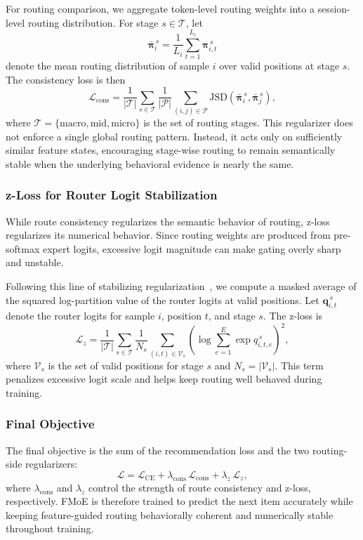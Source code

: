 \documentclass[sigconf,anonymous,review]{acmart}
\begin{document}
For routing comparison, we aggregate token-level routing weights into a session-level routing distribution. For stage $s \in \mathcal{T}$, let
\[
\bar{\boldsymbol{\pi}}_i^{\,s}
=
\frac{1}{L_i}\sum_{t=1}^{L_i}\boldsymbol{\pi}_{i,t}^{\,s}
\]
denote the mean routing distribution of sample $i$ over valid positions at stage $s$. The consistency loss is then
\[
\mathcal{L}_{\mathrm{cons}}
=
\frac{1}{|\mathcal{T}|}
\sum_{s \in \mathcal{T}}
\frac{1}{|\mathcal{P}|}
\sum_{(i,j)\in \mathcal{P}}
\mathrm{JSD}\!\left(\bar{\boldsymbol{\pi}}_i^{\,s}, \bar{\boldsymbol{\pi}}_j^{\,s}\right),
\]
where $\mathcal{T}=\{\mathrm{macro},\mathrm{mid},\mathrm{micro}\}$ is the set of routing stages. This regularizer does not enforce a single global routing pattern. Instead, it acts only on sufficiently similar feature states, encouraging stage-wise routing to remain semantically stable when the underlying behavioral evidence is nearly the same.

\subsubsection{z-Loss for Router Logit Stabilization}

While route consistency regularizes the semantic behavior of routing, z-loss regularizes its numerical behavior. Since routing weights are produced from pre-softmax expert logits, excessive logit magnitude can make gating overly sharp and unstable.

Following this line of stabilizing regularization~\cite{zoph2022stmoe}, we compute a masked average of the squared log-partition value of the router logits at valid positions. Let $\mathbf{q}_{i,t}^{\,s}$ denote the router logits for sample $i$, position $t$, and stage $s$. The z-loss is
\[
\mathcal{L}_{z}
=
\frac{1}{|\mathcal{T}|}
\sum_{s \in \mathcal{T}}
\frac{1}{N_s}
\sum_{(i,t)\in\mathcal{V}_s}
\left(
\log \sum_{e=1}^{E}\exp q_{i,t,e}^{\,s}
\right)^2,
\]
where $\mathcal{V}_s$ is the set of valid positions for stage $s$ and $N_s = |\mathcal{V}_s|$. This term penalizes excessive logit scale and helps keep routing well behaved during training.

\subsubsection{Final Objective}

The final objective is the sum of the recommendation loss and the two routing-side regularizers:
\[
\mathcal{L}
=
\mathcal{L}_{\mathrm{CE}}
+
\lambda_{\mathrm{cons}}\,\mathcal{L}_{\mathrm{cons}}
+
\lambda_{z}\,\mathcal{L}_{z},
\]
where $\lambda_{\mathrm{cons}}$ and $\lambda_z$ control the strength of route consistency and z-loss, respectively. FMoE is therefore trained to predict the next item accurately while keeping feature-guided routing behaviorally coherent and numerically stable throughout training.
\end{document}
